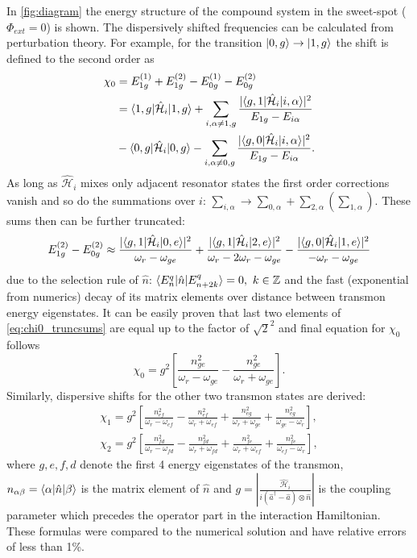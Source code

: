 \documentclass[12pt]{report}
\DeclarePairedDelimiter\bra{\langle}{\rvert}
\DeclarePairedDelimiter\ket{\lvert}{\rangle}
\newcommand{\sbrkt}[1]{\left[ #1 \right]}
\numberwithin{equation}{section}
\begin{document}
In \autoref{fig:diagram} the energy structure of the compound system in the sweet-spot ($\Phi_{ext}=0$) is shown. The dispersively shifted frequencies can be calculated from perturbation theory. For example, for the transition $\ket{0, g}\rightarrow \ket{1, g}$ the shift is defined to the second order as
\begin{align*}
\chi_0 &=  E_{1g}^{(1)} + E_{1g}^{(2)} - E_{0g}^{(1)} - E_{0g}^{(2)}\\
 &= \bra{1, g}\mathcal{\hat H}_i\ket{1,g} + \sum_{i, \alpha \neq 1, g} \frac{|\bra{g, 1}\mathcal{\hat H}_i\ket{i,\alpha} |^2}{E_{1g} - E_{i\alpha}}\\
 & - \bra{0, g}\mathcal{\hat H}_i\ket{0,g} - \sum_{i, \alpha \neq 0, g} \frac{|\bra{g, 0}\mathcal{\hat H}_i\ket{i,\alpha} |^2}{E_{1g} - E_{i\alpha}}.
\end{align*}
As long as $\mathcal{\hat H}_i$ mixes only adjacent resonator states the first order corrections vanish and so do the summations over $i$: $\sum_{i, \alpha} \rightarrow \sum_{0,\alpha} + \sum_{2,\alpha} (\sum_{1,\alpha})$. These sums then can be further truncated:
\begin{equation}
E_{1g}^{(2)} - E_{0g}^{(2)} \approx \frac{|\bra{g,1}\mathcal{\hat H}_i\ket{0,e}|^2}{\omega_r - \omega_{ge}} + \frac{|\bra{g,1}\mathcal{\hat H}_i\ket{2,e}|^2}{\omega_r - 2\omega_r - \omega_{ge}} -
\frac{|\bra{g,0}\mathcal{\hat H}_i\ket{1,e}|^2}{-\omega_r - \omega_{ge}}\label{eq:chi0_truncsums}
\end{equation} 
due to the selection rule of $\hat n$: $\bra{E^q_n}\hat n \ket{E^q_{n+2k}} = 0,\ k \in \mathbb{Z}$ and the fast (exponential from numerics) decay of its matrix elements over distance between transmon energy eigenstates. It can be easily proven that last two elements of \eqref{eq:chi0_truncsums} are equal up to the factor of $\sqrt{2}^2$ and final equation for $\chi_0$ follows
\begin{equation}
\chi_0 = g^2\sbrkt{\frac{n_{ge}^2}{\omega_r - \omega_{ge}}-\frac{n_{ge}^2}{\omega_r + \omega_{ge}}}.
\end{equation}
Similarly, dispersive shifts for the other two transmon states are derived:
\begin{gather*}
\chi_1 = g^2\sbrkt{\frac{n_{ef}^2}{\omega_r - \omega_{ef}} - \frac{n_{ef}^2}{\omega_r + \omega_{ef}} + \frac{n_{eg}^2}{\omega_r + \omega_{ge}}+ \frac{n_{eg}^2}{\omega_{ge}-\omega_r }},\\
\chi_2 = g^2\sbrkt{\frac{n_{fd}^2}{\omega_r - \omega_{fd}} -\frac{n_{fd}^2}{\omega_r + \omega_{fd}} + \frac{n_{fe}^2}{\omega_r + \omega_{ef}}+ \frac{n_{fe}^2}{\omega_{ef}-\omega_r}},
\end{gather*}
where $g, e, f, d$ denote the first 4 energy eigenstates of the transmon, $n_{\alpha\beta} = \bra{\alpha} \hat n \ket{\beta}$ is the matrix element of $\hat n$ and $g = \left.|\frac{\mathcal{\hat H}_i}{i(\hat a^\dag  - \hat a)\otimes \hat n}|\right.$ is the coupling parameter which precedes the operator part in the interaction Hamiltonian. These formulas were compared to the numerical solution and have relative errors of less than 1\%.
\end{document}
